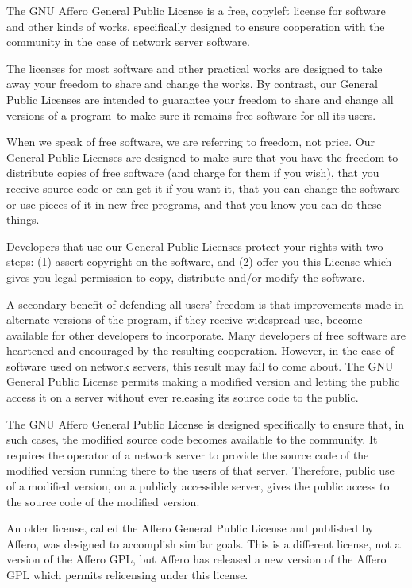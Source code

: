 \documentclass{article}%
\begin{document}
\begin{flushleft}
The GNU Affero General Public License is a free, copyleft license
for software and other kinds of works, specifically designed to ensure
cooperation with the community in the case of network server software.

The licenses for most software and other practical works are
designed to take away your freedom to share and change the works.  By
contrast, our General Public Licenses are intended to guarantee your
freedom to share and change all versions of a program--to make sure it
remains free software for all its users.

When we speak of free software, we are referring to freedom, not
price. Our General Public Licenses are designed to make sure that you
have the freedom to distribute copies of free software (and charge for
them if you wish), that you receive source code or can get it if you
want it, that you can change the software or use pieces of it in new
free programs, and that you know you can do these things.

Developers that use our General Public Licenses protect your rights
with two steps: (1) assert copyright on the software, and (2) offer
you this License which gives you legal permission to copy, distribute
and/or modify the software.

A secondary benefit of defending all users' freedom is that
improvements made in alternate versions of the program, if they
receive widespread use, become available for other developers to
incorporate. Many developers of free software are heartened and
encouraged by the resulting cooperation. However, in the case of
software used on network servers, this result may fail to come about.
The GNU General Public License permits making a modified version and
letting the public access it on a server without ever releasing its
source code to the public.

The GNU Affero General Public License is designed specifically to
ensure that, in such cases, the modified source code becomes available
to the community.  It requires the operator of a network server to
provide the source code of the modified version running there to the
users of that server.  Therefore, public use of a modified version, on
a publicly accessible server, gives the public access to the source
code of the modified version.

An older license, called the Affero General Public License and
published by Affero, was designed to accomplish similar goals. This is
a different license, not a version of the Affero GPL, but Affero has
released a new version of the Affero GPL which permits relicensing under
this license.


\end{flushleft}
\end{document}
